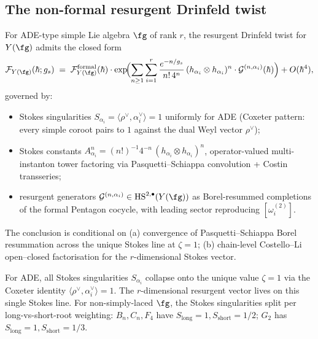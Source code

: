 \subsection{The non-formal resurgent Drinfeld twist}
\label{subsec:Yfg-resurgent-non-formal}

\begin{theorem}
\label{thm:Yfg-resurgent-Drinfeld-twist}
For ADE-type simple Lie algebra $\fg$ of rank $r$, the resurgent
Drinfeld twist for $Y(\fg)$ admits the closed form
\[
 \mathcal{F}_{Y(\fg)}(\hbar; g_s)
 \;=\; \mathcal{F}^{\mathrm{formal}}_{Y(\fg)}(\hbar)
 \cdot \exp\!\Bigl(\sum_{n \geq 1}\sum_{i = 1}^{r}
 \frac{e^{-n / g_s}}{n!\, 4^n}\,
 (h_{\alpha_i} \otimes h_{\alpha_i})^n
 \cdot \mathcal{G}^{(n, \alpha_i)}(\hbar)\Bigr)
 + O(\hbar^4),
\]
governed by:
\begin{itemize}
\item Stokes singularities $S_{\alpha_i} = \langle \rho^\vee, \alpha_i^\vee
 \rangle = 1$ uniformly for ADE \textup{(}Coxeter pattern: every
 simple coroot pairs to $1$ against the dual Weyl vector
 $\rho^\vee$\textup{);}
\item Stokes constants $A^n_{\alpha_i} = (n!)^{-1} 4^{-n}\,
 (h_{\alpha_i} \otimes h_{\alpha_i})^n$, operator-valued
 multi-instanton tower factoring via Pasquetti--Schiappa
 convolution + Costin transseries;
\item resurgent generators $\mathcal{G}^{(n, \alpha_i)} \in
 \mathrm{HS}^{2, \bullet}(Y(\fg))$ as Borel-resummed completions
 of the formal Pentagon cocycle, with leading sector reproducing
 $[\omega^{(2)}_i]$.
\end{itemize}
The conclusion is conditional on
\textup{(a)} convergence of Pasquetti--Schiappa Borel resummation
across the unique Stokes line at $\zeta = 1$;
\textup{(b)} chain-level Costello--Li open--closed factorisation for
the $r$-dimensional Stokes vector.
\end{theorem}

\begin{remark}
\label{rem:Yfg-stokes-collapse}
For ADE, all Stokes singularities $S_{\alpha_i}$ collapse onto the
unique value $\zeta = 1$ via the Coxeter identity
$\langle \rho^\vee, \alpha_i^\vee \rangle = 1$. The $r$-dimensional
resurgent vector lives on this single Stokes line. For non-simply-laced
$\fg$, the Stokes singularities split per long-vs-short-root weighting:
$B_n, C_n, F_4$ have $S_{\mathrm{long}} = 1, S_{\mathrm{short}} = 1/2$;
$G_2$ has $S_{\mathrm{long}} = 1, S_{\mathrm{short}} = 1/3$.
\end{remark}

